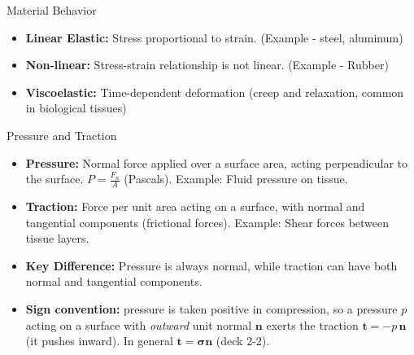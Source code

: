 \documentclass[aspectratio=169,11pt]{beamer}
\begin{document}
\begin{frame}{Material Behavior}
  \begin{itemize}
    \item \textbf{Linear Elastic:} Stress proportional to strain. (Example - steel, aluminum)
    \item \textbf{Non-linear:} Stress-strain relationship is not linear. (Example - Rubber)
    \item \textbf{Viscoelastic:} Time-dependent deformation (creep and relaxation, common in biological tissues)
  \end{itemize}
\end{frame}

\begin{frame}{Pressure and Traction}
  \begin{itemize}
    \item \textbf{Pressure:} Normal force applied over a surface area, acting perpendicular to the surface. $P = \frac{F_n}{A}$ (Pascals). Example: Fluid pressure on tissue.
    \item \textbf{Traction:} Force per unit area acting on a surface, with normal and tangential components (frictional forces). Example: Shear forces between tissue layers.
    \item \textbf{Key Difference:} Pressure is always normal, while traction can have both normal and tangential components.
    \item \textbf{Sign convention:} pressure is taken positive in compression, so a pressure $p$ acting on a surface with \emph{outward} unit normal $\mathbf{n}$ exerts the traction $\mathbf{t} = -p\,\mathbf{n}$ (it pushes inward). In general $\mathbf{t} = \boldsymbol{\sigma}\mathbf{n}$ (deck 2-2).
  \end{itemize}
\end{frame}
\end{document}
